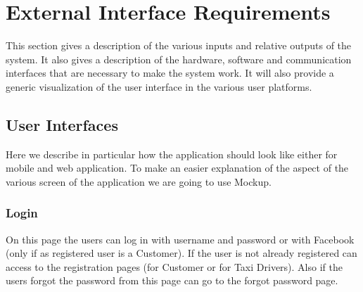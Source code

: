 \section{External Interface Requirements}
	This section gives a description of the various inputs and relative outputs of the system. It also gives a description of the hardware, software and communication interfaces that are necessary to make the system work. It will also provide a generic visualization of the user interface in the various user platforms.

		\subsection{User Interfaces}
		Here we describe in particular how the application should look like either for mobile and web application. To make an easier explanation of the aspect of the various screen of the application we are going to use Mockup.
			\subsubsection{Login}
			On this page the users can log in with username and password or with Facebook (only if as registered user is a Customer). If the user is not already registered can access to the registration pages (for Customer or for Taxi Drivers). Also if the users forgot the password from this page can go to the forgot password page.
				
